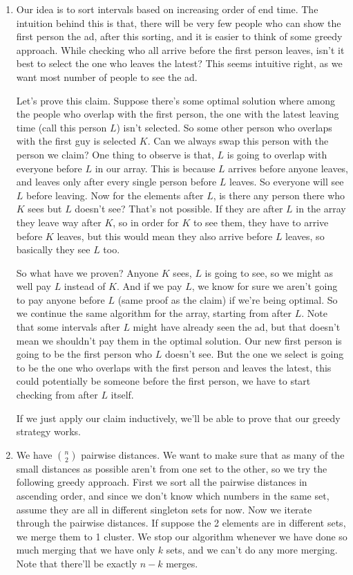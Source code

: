 \documentclass[12pt]{report}
\begin{document}
\begin{enumerate}[label=\textbf{\arabic*.}]
  \item Our idea is to sort intervals based on increasing order of end time. The intuition behind this is that, there will be very few people who can show the first person the ad,
  after this sorting, and it is easier to think of some greedy approach. While checking who all arrive before the first person leaves, isn't it best to select the one who leaves
  the latest? This seems intuitive right, as we want most number of people to see the ad.

  Let's prove this claim. Suppose there's some optimal solution where among the people who overlap with the first person, the one with the latest leaving time (call this person $L$)
  isn't selected. So some other person who overlaps with the first guy is selected $K$. Can we always swap this person with the person we claim? One thing to observe is that, $L$ 
  is going to overlap with everyone before $L$ in our array. This is because $L$ arrives before anyone leaves, and leaves only after every single person before $L$ leaves. So everyone
  will see $L$ before leaving. Now for the elements after $L$, is there any person there who $K$ sees but $L$ doesn't see? That's not possible. If they are after $L$ in the array
  they leave way after $K$, so in order for $K$ to see them, they have to arrive before $K$ leaves, but this would mean they also arrive before $L$ leaves, so basically they see $L$ too.
  
  So what have we proven? Anyone $K$ sees, $L$ is going to see, so we might as well pay $L$ instead of $K$. And if we pay $L$, we know for sure we aren't going to pay anyone before $L$
  (same proof as the claim) if we're being optimal. So we continue the same algorithm for the array, starting from after $L$. Note that some intervals after $L$ might have already seen 
  the ad, but that doesn't mean we shouldn't pay them in the optimal solution. Our new first person is going to be the first person who $L$ doesn't see. But the one we select is going to 
  be the one who overlaps with the first person and leaves the latest, this could potentially be someone before the first person, we have to start checking from after $L$ itself.

  If we just apply our claim inductively, we'll be able to prove that our greedy strategy works.

  \item We have $\binom{n}{2}$ pairwise distances. We want to make sure that as many of the small distances as possible aren't from one set to the other, so we try the following greedy 
  approach. First we sort all the pairwise distances in ascending order, and since we don't know which numbers in the same set, assume they are all in different singleton sets for now.
  Now we iterate through the pairwise distances. If suppose the 2 elements are in different sets, we merge them to 1 cluster. We stop our algorithm whenever we have done so much merging that 
  we have only $k$ sets, and we can't do any more merging. Note that there'll be exactly $n-k$ merges.


\end{enumerate}
\end{document}
